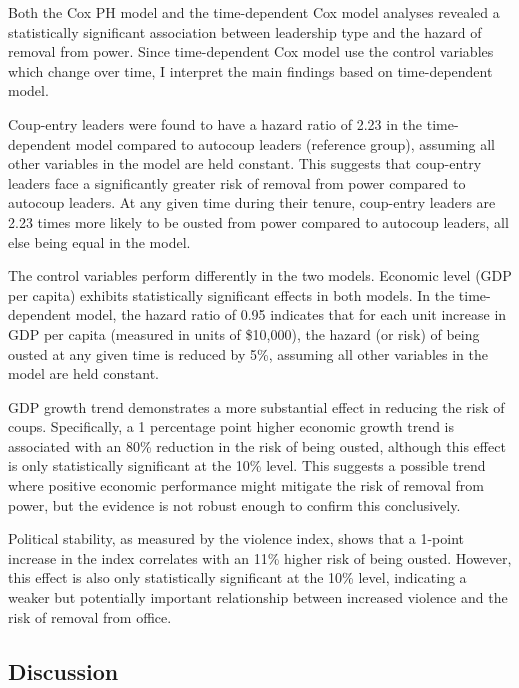 \documentclass[
  12pt,
]{report}
\begin{document}
Both the Cox PH model and the time-dependent Cox model analyses revealed
a statistically significant association between leadership type and the
hazard of removal from power. Since time-dependent Cox model use the
control variables which change over time, I interpret the main findings
based on time-dependent model.

Coup-entry leaders were found to have a hazard ratio of 2.23 in the
time-dependent model compared to autocoup leaders (reference group),
assuming all other variables in the model are held constant. This
suggests that coup-entry leaders face a significantly greater risk of
removal from power compared to autocoup leaders. At any given time
during their tenure, coup-entry leaders are 2.23 times more likely to be
ousted from power compared to autocoup leaders, all else being equal in
the model.

The control variables perform differently in the two models. Economic
level (GDP per capita) exhibits statistically significant effects in
both models. In the time-dependent model, the hazard ratio of 0.95
indicates that for each unit increase in GDP per capita (measured in
units of \$10,000), the hazard (or risk) of being ousted at any given
time is reduced by 5\%, assuming all other variables in the model are
held constant.

GDP growth trend demonstrates a more substantial effect in reducing the
risk of coups. Specifically, a 1 percentage point higher economic growth
trend is associated with an 80\% reduction in the risk of being ousted,
although this effect is only statistically significant at the 10\%
level. This suggests a possible trend where positive economic
performance might mitigate the risk of removal from power, but the
evidence is not robust enough to confirm this conclusively.

Political stability, as measured by the violence index, shows that a
1-point increase in the index correlates with an 11\% higher risk of
being ousted. However, this effect is also only statistically
significant at the 10\% level, indicating a weaker but potentially
important relationship between increased violence and the risk of
removal from office.

\subsection{Discussion}\label{discussion-1}
\end{document}
